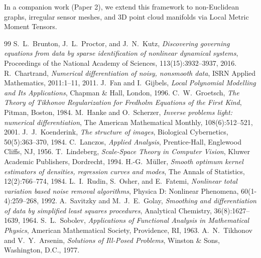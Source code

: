 \documentclass[11pt,a4paper]{article}
\theoremstyle{definition}
\begin{document}
In a companion work (Paper 2), we extend this framework to non-Euclidean graphs, irregular sensor meshes, and 3D point cloud manifolds via Local Metric Moment Tensors.

\begin{thebibliography}{99}
 S.~L.~Brunton, J.~L.~Proctor, and J.~N.~Kutz, \emph{Discovering governing equations from data by sparse identification of nonlinear dynamical systems}, Proceedings of the National Academy of Sciences, 113(15):3932--3937, 2016.
 R.~Chartrand, \emph{Numerical differentiation of noisy, nonsmooth data}, ISRN Applied Mathematics, 2011:1--11, 2011.
 J.~Fan and I.~Gijbels, \emph{Local Polynomial Modelling and Its Applications}, Chapman \& Hall, London, 1996.
 C.~W.~Groetsch, \emph{The Theory of Tikhonov Regularization for Fredholm Equations of the First Kind}, Pitman, Boston, 1984.
 M.~Hanke and O.~Scherzer, \emph{Inverse problems light: numerical differentiation}, The American Mathematical Monthly, 108(6):512--521, 2001.
 J.~J.~Koenderink, \emph{The structure of images}, Biological Cybernetics, 50(5):363--370, 1984.
 C.~Lanczos, \emph{Applied Analysis}, Prentice-Hall, Englewood Cliffs, NJ, 1956.
 T.~Lindeberg, \emph{Scale-Space Theory in Computer Vision}, Kluwer Academic Publishers, Dordrecht, 1994.
 H.-G.~M\"uller, \emph{Smooth optimum kernel estimators of densities, regression curves and modes}, The Annals of Statistics, 12(2):766--774, 1984.
 L.~I.~Rudin, S.~Osher, and E.~Fatemi, \emph{Nonlinear total variation based noise removal algorithms}, Physica D: Nonlinear Phenomena, 60(1-4):259--268, 1992.
 A.~Savitzky and M.~J.~E.~Golay, \emph{Smoothing and differentiation of data by simplified least squares procedures}, Analytical Chemistry, 36(8):1627--1639, 1964.
 S.~L.~Sobolev, \emph{Applications of Functional Analysis in Mathematical Physics}, American Mathematical Society, Providence, RI, 1963.
 A.~N.~Tikhonov and V.~Y.~Arsenin, \emph{Solutions of Ill-Posed Problems}, Winston \& Sons, Washington, D.C., 1977.
\end{thebibliography}
\end{document}
